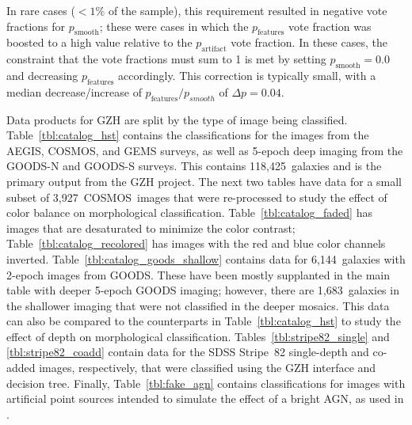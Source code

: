\documentclass[twocolumn]{aastex6}
\begin{document}
\noindent In rare cases ($<1\%$ of the sample), this requirement resulted in negative vote fractions for $p_\mathrm{smooth}$; these were cases in which the $p_\mathrm{features}$ vote fraction was boosted to a high value relative to the $p_\mathrm{artifact}$ vote fraction. In these cases, the constraint that the vote fractions must sum to 1 is met by setting $p_\mathrm{smooth}=0.0$ and decreasing $p_\mathrm{features}$ accordingly. This correction is typically small, with a median decrease/increase of $p_\mathrm{features}/p_{smooth}$ of $\Delta p = 0.04$.

Data products for GZH are split by the type of image being classified. Table~\ref{tbl:catalog_hst} contains the classifications for the \hst{} images from the AEGIS, COSMOS, and GEMS surveys, as well as 5-epoch deep imaging from the GOODS-N and GOODS-S surveys. This contains 118,425~galaxies and is the primary output from the GZH project. The next two tables have data for a small subset of 3,927~COSMOS~images that were re-processed to study the effect of color balance on morphological classification. Table~\ref{tbl:catalog_faded} has images that are desaturated to minimize the color contrast; Table~\ref{tbl:catalog_recolored} has images with the red and blue color channels inverted. Table~\ref{tbl:catalog_goods_shallow} contains data for 6,144~galaxies with 2-epoch images from GOODS. These have been mostly supplanted in the main table with deeper 5-epoch GOODS imaging; however, there are 1,683~galaxies in the shallower imaging that were not classified in the deeper mosaics. This data can also be compared to the counterparts in Table~\ref{tbl:catalog_hst} to study the effect of depth on morphological classification. Tables~\ref{tbl:stripe82_single} and \ref{tbl:stripe82_coadd} contain data for the SDSS Stripe~82 single-depth and co-added images, respectively, that were classified using the GZH interface and decision tree. Finally, Table~\ref{tbl:fake_agn} contains classifications for images with artificial point sources intended to simulate the effect of a bright AGN, as used in \citet{sim14}.  
\end{document}
